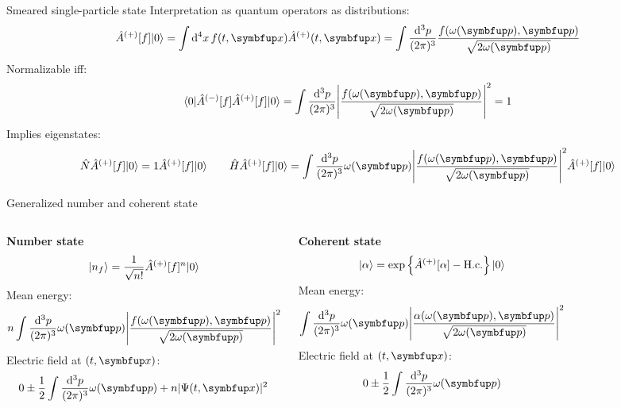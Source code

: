 \documentclass[aspectratio=169,usenames,dvipsnames]{beamer}
\begin{document}
	\begin{frame}{Smeared single-particle state}
		Interpretation as quantum operators as distributions:
		\begin{equation}
			\hat{A}^{(+)}[f]
			\ket{0}
			=
			\int\dd[4]{x}
			f(t,\vb{x})
			\hat{A}^{(+)}(t,\vb{x})
			=
			\int\frac{\dd[3]{p}}{(2\pi)^3}
			\frac{f\!\left(\omega(\vb{p}),\vb{p}\right)}{\sqrt{2\omega(\vb{p})}}
		\end{equation}
		Normalizable iff:
		\begin{equation}
			\bra{0}
			\hat{A}^{(-)}[f]
			\hat{A}^{(+)}[f]
			\ket{0}
			=
			\int\frac{\dd[3]{p}}{(2\pi)^3}
			\abs*{\frac{f\!\left(\omega(\vb{p}),\vb{p}\right)}{\sqrt{2\omega(\vb{p})}}}^2
			=
			1
		\end{equation}
		Implies eigenstates:
		\begin{equation}
			\hat{N}
			\hat{A}^{(+)}[f]
			\ket{0}
			=
			1
			\hat{A}^{(+)}[f]
			\ket{0}
			\qquad
			\hat{H}
			\hat{A}^{(+)}[f]
			\ket{0}
			=
			\int\frac{\dd[3]{p}}{(2\pi)^3}
			\omega(\vb{p})
			\abs*{\frac{f\!\left(\omega(\vb{p}),\vb{p}\right)}{\sqrt{2\omega(\vb{p})}}}^2
			\hat{A}^{(+)}[f]
			\ket{0}
		\end{equation}
	\end{frame}
	
	\begin{frame}{Generalized number and coherent state}
		\begin{columns}[c, onlytextwidth]
			\textbf{Number state}
			\begin{equation}
				\lvert n_f\rangle
				=
				\frac{1}{\sqrt{n!}}
				\hat{A}^{(+)}[f]^n
				\lvert0\rangle
			\end{equation}
			Mean energy:
			\begin{equation}
				n
				\int\frac{\dd[3]{p}}{(2\pi)^3}
				\omega(\vb{p})
				\abs*{\frac{f\!\left(\omega(\vb{p}),\vb{p}\right)}{\sqrt{2\omega(\vb{p})}}}^2
			\end{equation}
			Electric field at $(t,\vb{x})$:
			\begin{equation}
				0
				\pm
				\frac{1}{2}
				\int\frac{\dd[3]{p}}{(2\pi)^3}
				\omega(\vb{p})
				+
				n
				\abs{\Psi(t,\vb{x})}^2
			\end{equation}

			\textbf{Coherent state}
			\begin{equation}
				\lvert\alpha\rangle
				=
				\exp\left\{
					\hat{A}^{(+)}[\alpha]
					-
					\text{H.c.}
				\right\}
				\lvert0\rangle
			\end{equation}
			Mean energy:
			\begin{equation}
				\int\frac{\dd[3]{p}}{(2\pi)^3}
				\omega(\vb{p})
				\abs*{\frac{\alpha\!\left(\omega(\vb{p}),\vb{p}\right)}{\sqrt{2\omega(\vb{p})}}}^2
			\end{equation}
			Electric field at $(t,\vb{x})$:
			\begin{equation}
				0
				\pm
				\frac{1}{2}
				\int\frac{\dd[3]{p}}{(2\pi)^3}
				\omega(\vb{p})
			\end{equation}
		\end{columns}
	\end{frame}
	
\end{document}
